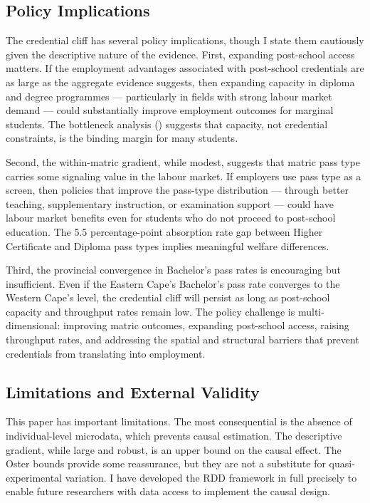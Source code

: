 \documentclass[12pt]{article}
\begin{document}
\subsection{Policy Implications}

The credential cliff has several policy implications, though I state them cautiously given the descriptive nature of the evidence. First, expanding post-school access matters. If the employment advantages associated with post-school credentials are as large as the aggregate evidence suggests, then expanding capacity in diploma and degree programmes --- particularly in fields with strong labour market demand --- could substantially improve employment outcomes for marginal students. The bottleneck analysis () suggests that capacity, not credential constraints, is the binding margin for many students.

Second, the within-matric gradient, while modest, suggests that matric pass type carries some signaling value in the labour market. If employers use pass type as a screen, then policies that improve the pass-type distribution --- through better teaching, supplementary instruction, or examination support --- could have labour market benefits even for students who do not proceed to post-school education. The 5.5 percentage-point absorption rate gap between Higher Certificate and Diploma pass types implies meaningful welfare differences.

Third, the provincial convergence in Bachelor's pass rates is encouraging but insufficient. Even if the Eastern Cape's Bachelor's pass rate converges to the Western Cape's level, the credential cliff will persist as long as post-school capacity and throughput rates remain low. The policy challenge is multi-dimensional: improving matric outcomes, expanding post-school access, raising throughput rates, and addressing the spatial and structural barriers that prevent credentials from translating into employment.

\subsection{Limitations and External Validity}

This paper has important limitations. The most consequential is the absence of individual-level microdata, which prevents causal estimation. The descriptive gradient, while large and robust, is an upper bound on the causal effect. The Oster bounds provide some reassurance, but they are not a substitute for quasi-experimental variation. I have developed the RDD framework in full precisely to enable future researchers with data access to implement the causal design.
\end{document}
